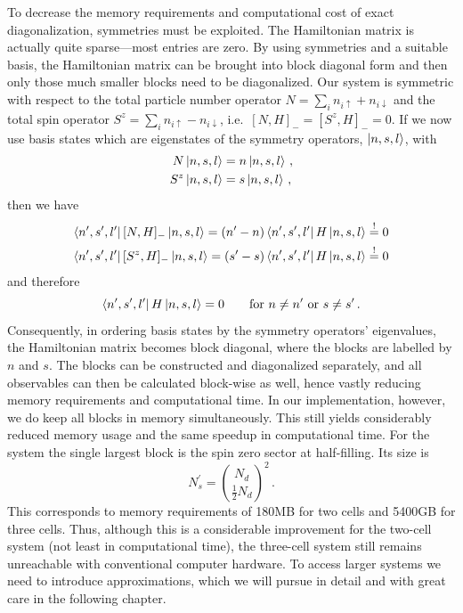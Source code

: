 %
To decrease the memory requirements and computational cost of exact
diagonalization, symmetries must be exploited. The Hamiltonian matrix is
actually quite sparse---most entries are zero. By using symmetries and a
suitable basis, the Hamiltonian matrix can be brought into block diagonal form
and then only those much smaller blocks need to be diagonalized. Our 
system is symmetric with respect to the total particle number operator $N =
\sum_i n_{i\uparrow} + n_{i\downarrow}$ and the total spin operator $S^z =
\sum_i n_{i\uparrow} - n_{i\downarrow}$, i.e.\ $[N,H]_- = [S^z,H]_- = 0$. If we
now use basis states which are eigenstates of the symmetry operators,
$\left|n,s,l\right>$, with
%
\begin{equation}
\begin{split}
  N \left|n,s,l\right> &= n \left|n,s,l\right> \, , \\
  S^z \left|n,s,l\right> &= s \left|n,s,l\right> \, ,
\end{split}
\end{equation}
%
then we have
%
\begin{equation}
\begin{split}
  \left<n^{\prime},s^{\prime},l^{\prime}\right| [N,H]_- \left|n,s,l\right> = 
  (n^{\prime} - n) \left<n^{\prime},s^{\prime},l^{\prime}\right| H \left|n,s,l\right>
  \stackrel{!}{=} 0 \\
  \left<n^{\prime},s^{\prime},l^{\prime}\right| [S^z,H]_- \left|n,s,l\right> = 
  (s^{\prime} - s) \left<n^{\prime},s^{\prime},l^{\prime}\right| H \left|n,s,l\right>
  \stackrel{!}{=} 0
\end{split}
\end{equation}
%
and therefore
%
\begin{equation}
  \left<n^{\prime},s^{\prime},l^{\prime}\right| H \left|n,s,l\right> = 0 \qquad
  \textrm{for } n \ne n^{\prime} \textrm{ or } s \ne s^{\prime} \, .
\end{equation}
%
Consequently, in ordering basis states by the symmetry operators' eigenvalues,
the Hamiltonian matrix becomes block diagonal, where the blocks are labelled by
$n$ and $s$. The blocks can be constructed and diagonalized separately, and all
observables can then be calculated block-wise as well, hence vastly reducing
memory requirements and computational time. In our implementation, however, we
do keep all blocks in memory simultaneously. This still yields considerably
reduced memory usage and the same speedup in computational time. For the
 system the single largest block is the spin zero sector at
half-filling. Its size is
%
\begin{equation}
  N_s^{\prime} = \binom{N_d}{\frac{1}{2} N_d}^2 \, .
\end{equation}
%
This corresponds to memory requirements of 180MB for two cells and 5400GB for
three cells. Thus, although this is a considerable improvement for the two-cell
system (not least in computational time), the three-cell system still remains
unreachable with conventional computer hardware. To access larger systems we
need to introduce approximations, which we will pursue in detail and with great
care in the following chapter.


